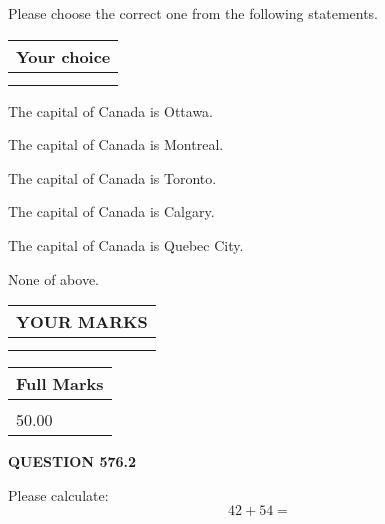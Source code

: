 \documentclass[12pt]{article}
\begin{document}
  
Please choose the correct one from the following statements.
  
  
\noindent\hspace{3.0in} \begin{tabular}{|l|}
\hline
Your choice \\
\hline
 \\ 
 \\ 
\hline
\end{tabular}
  
  
 
 
The capital of Canada is Ottawa.
 
 
The capital of Canada is Montreal.
 
 
The capital of Canada is Toronto.
 
 
The capital of Canada is Calgary.
 
 
The capital of Canada is Quebec City.
 
 
 None of above.
 
 
  
\vspace{0.2in}
  
\noindent\begin{tabular}{|l|}
\hline
 YOUR MARKS  \\
\hline
 \\ 
 \\ 
\hline
\end{tabular}
\hspace{0.05in} \begin{tabular}{|l|}
\hline
 Full Marks  \\
\hline
 \\ 
50.00 \\
\hline
\end{tabular}
{\textbf{\Large{QUESTION
576.2 
}}}
  
  
 
Please calculate:
\begin{equation}
42 +  %
54 = \nonumber
\end{equation}
 

 

 
   
   
 \vspace{0.2in}
 
   
   
   
   
\end{document}
